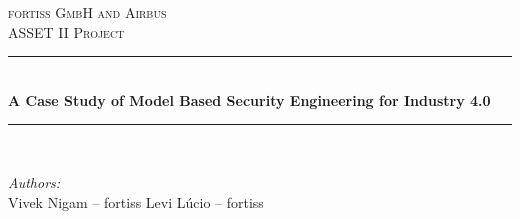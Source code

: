 \begin{titlepage}

\newcommand{\HRule}{\rule{\linewidth}{0.5mm}} %

\center %
 

\textsc{\LARGE fortiss GmbH and Airbus}\\[1.5cm] %
\textsc{\Large ASSET II Project}\\[0.5cm] %


\HRule \\[0.4cm]
{ \huge \bfseries A Case Study of Model Based Security Engineering for Industry 4.0}\\[0.4cm] %
\HRule \\[1cm]
 

\begin{minipage}{0.5\textwidth}
\begin{flushleft} \large
\emph{Authors:}\\
Vivek {Nigam} -- fortiss \qquad%
\qquad Levi L\'ucio -- fortiss 
\end{flushleft}
\end{minipage}
~
\begin{minipage}{0.4\textwidth}
\end{minipage}\\[1cm]



\end{titlepage}
